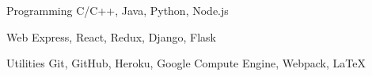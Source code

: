 
\vspace{-0.3cm}


\begin{cvskills}


  \cvskill
  {Programming}
  {C/C++, Java, Python, Node.js}


  \cvskill
  {Web}
  {Express, React, Redux, Django, Flask}


  \cvskill
  {Utilities}
  {Git, GitHub, Heroku, Google Compute Engine, Webpack, \LaTeX}


\end{cvskills}

